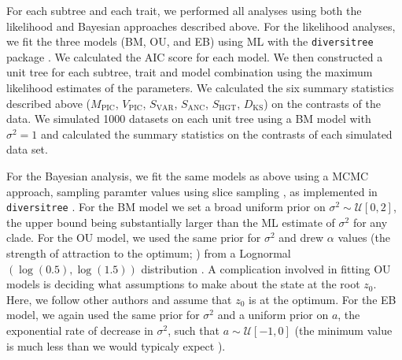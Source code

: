\documentclass[a4paper,12pt]{article}
\begin{document}
For each subtree and each trait, we performed all analyses using both the likelihood and Bayesian approaches described above. For the likelihood analyses, we fit the three models (BM, OU, and EB) using ML with the \texttt{diversitree} package \citep{FitzJohn2012}. We calculated the AIC score for each model. We then constructed a unit tree for each subtree, trait and model combination using the maximum likelihood estimates of the parameters. We calculated the six summary statistics described above ($M_{\text{PIC}}$, $V_{\text{PIC}}$, $S_{\text{VAR}}$, $S_{\text{ANC}}$, $S_{\text{HGT}}$, $D_{\text{KS}}$) on the contrasts of the data. We simulated 1000 datasets on each unit tree using a BM model with $\sigma^2=1$ and calculated the summary statistics on the contrasts of each simulated data set. 

For the Bayesian analysis, we fit the same models as above using a MCMC approach, sampling paramter values using slice sampling \citep{Nealslice}, as implemented in  \texttt{diversitree} \citep{FitzJohn2012}. For the BM model we set a broad uniform prior on $\sigma^2 \sim \mathcal{U}[0, 2]$, the upper bound being substantially larger than the ML estimate of $\sigma^2$ for any clade. For the OU model, we used the same prior for $\sigma^2$ and drew $\alpha$ values (the strength of attraction to the optimum; \citep{Hansen1997}) from a Lognormal$(\log(0.5), \log(1.5))$ distribution \citep{UyedaBayou}. A complication involved in fitting OU models is deciding what assumptions to make about the state at the root $z_0$. Here, we follow other authors \citep{ButlerKing2004, Beaulieu2012} and assume that $z_0$ is at the optimum. For the EB model, we again used the same prior for $\sigma^2$ and a uniform prior on $a$, the exponential rate of decrease in $\sigma^2$, such that $a \sim \mathcal{U}[-1, 0]$ (the minimum value is much less than we would typicaly expect \citep{SlaterPennell}).
\end{document}
